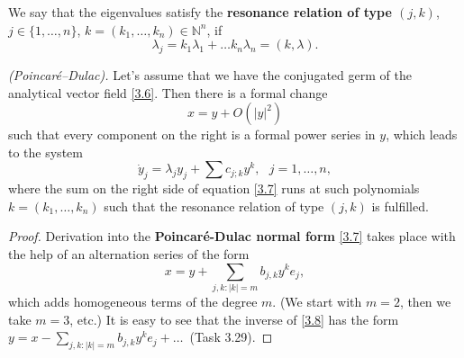 \begin{definition}
	We say that the eigenvalues satisfy the \textbf{resonance relation of type $\left( j,k\right)$}, $j\in	\{1,\ldots ,n\}$, $k=\left( k_{1},\ldots, k_{n}\right) \in \mathbb{N}^{n}$, if
	$$
	\lambda _{j}=k_{1}\lambda _{1}+\ldots k_{n}\lambda _{n}=(k,\lambda ).
	$$
\end{definition}

\begin{theorem}\emph{(Poincaré–Dulac).} \label{theo:3.23}
	Let's assume that we have the conjugated germ of the analytical vector field \eqref{3.6}. Then there is a formal change
	$$
	x=y+O(\left\vert y\right\vert ^{2})
	$$
	such that every component on the right is a formal power series in $y$, which leads to the system
	\begin{equation}
	\label{3.7}
	\dot{y}_{j}=\lambda _{j}y_{j}+\sum c_{j;k}y^{k},\text{ \ \ \ }j=1,\ldots ,n,
	\end{equation}
	where the sum on the right side of equation \eqref{3.7} runs at such polynomials $k=(k_{1},\ldots ,k_{n})$ such that the resonance relation of type $\left( j,k\right)$ is fulfilled.
	\begin{proof}
		Derivation into the \textbf{Poincaré-Dulac normal form} \eqref{3.7} takes place with the help of an alternation series of the form
		\begin{equation}
		\label{3.8}
		x=y+\sum_{j,k:\left\vert k\right\vert =m}b_{j,k}y^{k}e_{j},
		\end{equation}
		which adds homogeneous terms of the degree $ m$. (We start with $m = 2$, then we take $m = 3$, etc.) It is easy to see that the inverse of \eqref{3.8} has the form $y=x-\sum_{j,k:\left\vert k\right\vert
			=m}b_{j,k}y^{k}e_{j}+\ldots $\ (Task 3.29).
		

\end{proof}
\end{theorem}
